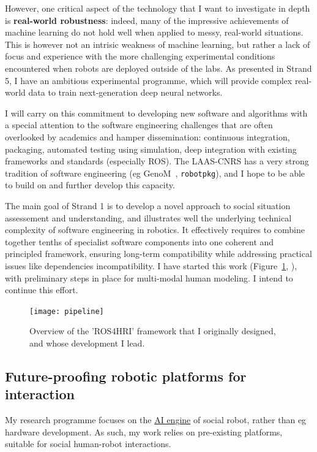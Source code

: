 However, one critical aspect of the technology that I want to investigate in
depth is \textbf{real-world robustness}: indeed, many of the impressive
achievements of machine learning do not hold well when applied to messy,
real-world situations. This is however not an intrisic weakness of machine
learning, but rather a lack of focus and experience with the more challenging
experimental conditions encountered when robots are deployed outside of the
labs. As presented in Strand 5, I have an ambitious experimental programme,
which will provide complex real-world data to train next-generation deep neural
networks.

I will carry on this commitment to developing new software and algorithms with a
special attention to the software engineering challenges that are often
overlooked by academics and hamper dissemination: continuous integration,
packaging, automated testing using simulation, deep integration with existing
frameworks and standards (especially ROS). The LAAS-CNRS has a very strong
tradition of software engineering (eg GenoM~\autocite{mallet2010genom3},
\texttt{robotpkg}), and I hope to be able to build on and further develop this
capacity.

The main goal of Strand 1 is to develop a novel approach to social situation
assessement and understanding, and illustrates well the underlying technical
complexity of software engineering in robotics. It effectively requires to
combine together tenths of specialist software components into one coherent and
principled framework, ensuring long-term compatibility while addressing
practical issues like dependencies incompatibility. I have started this work
(Figure~\ref{fig:ros4hri}, ), with preliminary steps in place
for multi-modal human modeling. I intend to continue this effort.

\begin{figure}[ht]
    \centering
    \texttt{[image: pipeline]}
    \caption{Overview of the 'ROS4HRI' framework that I originally designed, and
    whose development I lead.}
    \label{fig:ros4hri}
\end{figure}

\subsection{Future-proofing robotic platforms for interaction}

My research programme focuses on the \ul{AI engine} of social robot, rather than
eg hardware development. As such, my work relies on pre-existing platforms,
suitable for social human-robot interactions.

